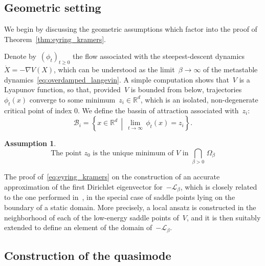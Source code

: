 \documentclass[10pt]{article}
\newcommand{\cL}{\mathcal{L}}
\newcommand{\R}{\mathbb{R}}
\newcommand{\1}{\mathbbm 1}
\newcommand{\largeRadius}{\delta}
\newcommand{\smallRadius}{\gamma}
\newcommand{\epsLimit}[1]{\alpha^{(#1)}} %
\newcommand{\localNeighborhood}[2][]{\mathcal{O}_{#2}^{#1}} %
\newcommand{\localCuboid}[1]{\mathcal R_{#1}}
\newcommand{\hessPassage}[2][]{U^{(#2)#1}} %
\newcommand{\shift}{\rho} %
\newtheorem{hypothesis}{Assumption}
\begin{document}
    
    \subsection{Geometric setting}
    We begin by discussing the geometric assumptions which factor into the proof of Theorem~\ref{thm:eyring_kramers}. 

    Denote by~$(\phi_t)_{t\geq 0}$ the flow associated with the steepest-descent dynamics~$\dot X = -\nabla V(X)$, which can be understood as the limit~$\beta\to\infty$ of the metastable dynamics~\eqref{eq:overdamped_langevin}.
    A simple computation shows that~$V$ is a Lyapunov function, so that, provided~$V$ is bounded from below, trajectories~$\phi_t(x)$ converge to some minimum~$z_i\in\R^d$, which is an isolated, non-degenerate critical point of index 0.
    We define the bassin of attraction associated with~$z_i$:
    \begin{equation}
        \label{eq:attractor_bassin}
        \mathcal B_i  = \left\{x\in \R^d\,\middle|\,\underset{t\to\infty}{\lim}\,\phi_t(x)=z_i\right\}.
    \end{equation}

    \begin{hypothesis}  
        \begin{equation}\label{hyp:one_minimum}
           \text{The point } z_0\text{ is the unique minimum of $V$ in }\bigcap_{\beta>0}\,\Omega_\beta \tag{\bf EK1}
        \end{equation}
    \end{hypothesis}

    The proof of~\eqref{eq:eyring_kramers} on the construction of an accurate approximation of the first Dirichlet eigenvector for~$-\cL_\beta$, which is closely related to the one performed in~\cite{LPN21}, in the special case of saddle points lying on the boundary of a static domain.
    More precisely, a local ansatz is constructed in the neighborhood of each of the low-energy saddle points of~$V$, and it is then suitably extended to define an element of the domain of~$-\cL_\beta$.
        

        \subsection{Construction of the quasimode}
             
\end{document}
